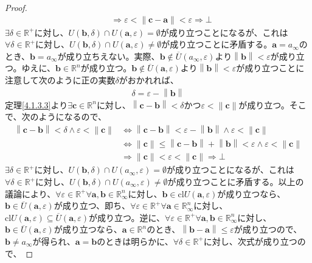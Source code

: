 \documentclass[dvipdfmx]{jsarticle}
\begin{document}
\begin{proof}
\begin{align*}
&\Rightarrow \varepsilon < \left\| \mathbf{c} - \mathbf{a} \right\| < \varepsilon \Rightarrow \bot
\end{align*}
$\exists\delta \in \mathbb{R}^{+}$に対し、$U\left( \mathbf{b},\delta \right) \cap U\left( \mathbf{a},\varepsilon \right) = \emptyset$が成り立つことになるが、これは$\forall\delta \in \mathbb{R}^{+}$に対し、$U\left( \mathbf{b},\delta \right) \cap U\left( \mathbf{a},\varepsilon \right) \neq \emptyset$が成り立つことに矛盾する。$\mathbf{a} = a_{\infty}$のとき、$\mathbf{b} = a_{\infty}$が成り立ちえない。実際、$\mathbf{b} \notin \overline{U}\left( a_{\infty},\varepsilon \right)$より$\left\| \mathbf{b} \right\| < \varepsilon$が成り立つ。ゆえに、$\mathbf{b} \in \mathbb{R}^{n}$が成り立つ。$\mathbf{b} \notin \overline{U}\left( \mathbf{a},\varepsilon \right)$より$\left\| \mathbf{b} \right\| < \varepsilon$が成り立つことに注意して次のように正の実数$\delta$がおかれれば、
\begin{align*}
\delta = \varepsilon - \left\| \mathbf{b} \right\|
\end{align*}
定理\ref{4.1.3.3}より$\exists\mathbf{c} \in \mathbb{R}^{n}$に対し、$\left\| \mathbf{c} - \mathbf{b} \right\| < \delta$かつ$\varepsilon < \left\| \mathbf{c} \right\|$が成り立つ。そこで、次のようになるので、
\begin{align*}
\left\| \mathbf{c} - \mathbf{b} \right\| < \delta \land \varepsilon < \left\| \mathbf{c} \right\| &\Leftrightarrow \left\| \mathbf{c} - \mathbf{b} \right\| < \varepsilon - \left\| \mathbf{b} \right\| \land \varepsilon < \left\| \mathbf{c} \right\|\\
&\Leftrightarrow \left\| \mathbf{c} \right\| \leq \left\| \mathbf{c} - \mathbf{b} \right\| + \left\| \mathbf{b} \right\| < \varepsilon \land \varepsilon < \left\| \mathbf{c} \right\|\\
&\Rightarrow \left\| \mathbf{c} \right\| < \varepsilon < \left\| \mathbf{c} \right\| \Rightarrow \bot
\end{align*}
$\exists\delta \in \mathbb{R}^{+}$に対し、$U\left( \mathbf{b},\delta \right) \cap U\left( a_{\infty},\varepsilon \right) = \emptyset$が成り立つことになるが、これは$\forall\delta \in \mathbb{R}^{+}$に対し、$U\left( \mathbf{b},\delta \right) \cap U\left( a_{\infty},\varepsilon \right) \neq \emptyset$が成り立つことに矛盾する。以上の議論により、$\forall\varepsilon \in \mathbb{R}^{+}\forall\mathbf{a},\mathbf{b} \in \mathbb{R}_{\infty}^{n}$に対し、$\mathbf{b} \in \mathrm{cl}{U\left( \mathbf{a},\varepsilon \right)}$が成り立つなら、$\mathbf{b} \in \overline{U}\left( \mathbf{a},\varepsilon \right)$が成り立つ、即ち、$\forall\varepsilon \in \mathbb{R}^{+}\forall\mathbf{a} \in \mathbb{R}_{\infty}^{n}$に対し、$\mathrm{cl}{U\left( \mathbf{a},\varepsilon \right)} \subseteq \overline{U}\left( \mathbf{a},\varepsilon \right)$が成り立つ。逆に、$\forall\varepsilon \in \mathbb{R}^{+}\forall\mathbf{a,b} \in \mathbb{R}_{\infty}^{n}$に対し、$\mathbf{b} \in \overline{U}\left( \mathbf{a},\varepsilon \right)$が成り立つなら、$\mathbf{a} \in \mathbb{R}^{n}$のとき、$\left\| \mathbf{b} - \mathbf{a} \right\| \leq \varepsilon$が成り立つので、$\mathbf{b} \neq a_{\infty}$が得られ、$\mathbf{a} = \mathbf{b}$のときは明らかに、$\forall\delta \in \mathbb{R}^{+}$に対し、次式が成り立つので、

\end{proof}
\end{document}
